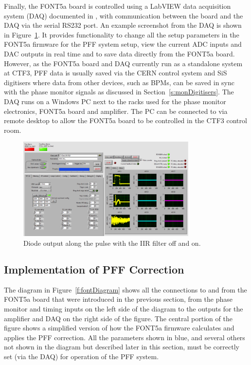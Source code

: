 Finally, the FONT5a board is controlled using a LabVIEW data acquisition system (DAQ) documented in \cite{dougThesis}, with communication between the board and the DAQ via the serial RS232 port. An example screenshot from the DAQ is shown in Figure~\ref{f:DAQScreenshot}. It provides functionality to change all the setup parameters in the FONT5a firmware for the PFF system setup, view the current ADC inputs and DAC outputs in real time and to save data directly from the FONT5a board. However, as the FONT5a board and DAQ currently run as a standalone system at CTF3, PFF data is usually saved via the CERN control system and SiS digitisers where data from other devices, such as BPMs, can be saved in sync with the phase monitor signals as discussed in Section~\ref{s:monDigitisers}. The DAQ runs on a Windows PC next to the racks used for the phase monitor electronics, FONT5a board and amplifier. The PC can be connected to via remote desktop to allow the FONT5a board to be controlled in the CTF3 control room.

\begin{figure}
  \centering
  \includegraphics[width=0.8\textwidth]{Figures/commissioning/DAQScreenshot}
  \caption{Diode output along the pulse with the IIR filter off and on.}
  \label{f:DAQScreenshot}
\end{figure}

\subsection{Implementation of PFF Correction}
\label{ss:pffFirmware}

The diagram in Figure~\ref{f:fontDiagram} shows all the connections to and from the FONT5a board that were introduced in the previous section, from the phase monitor and timing inputs on the left side of the diagram to the outputs for the amplifier and DAQ on the right side of the figure. The central portion of the figure shows a simplified version of how the FONT5a firmware calculates and applies the PFF correction. All the parameters shown in blue, and several others not shown in the diagram but described later in this section, must be correctly set (via the DAQ) for operation of the PFF system.

